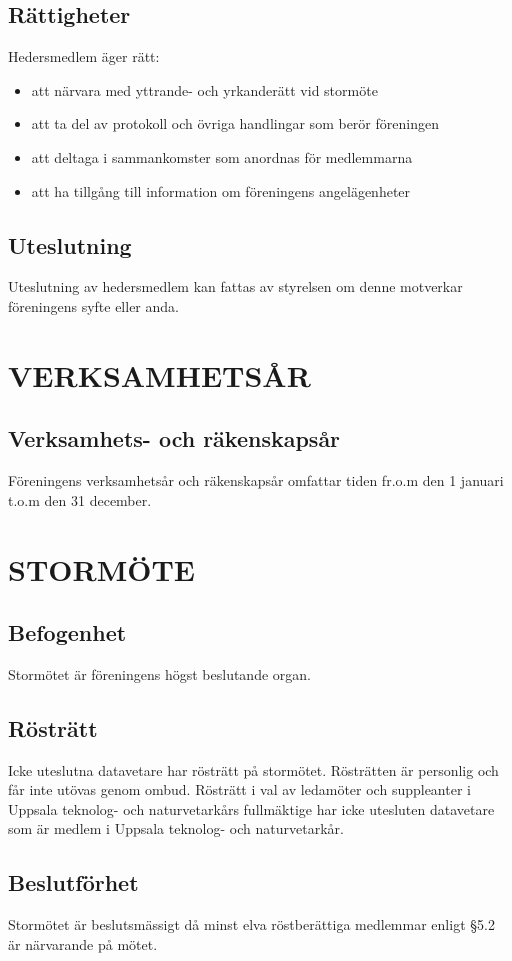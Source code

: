 \documentclass[a4paper]{article}
\begin{document}
{{    \subsection{Rättigheter}
    Hedersmedlem äger rätt:
    \begin{itemize}
    \item att närvara med yttrande- och yrkanderätt vid stormöte
    \item att ta del av protokoll och övriga handlingar som berör föreningen
    \item att deltaga i sammankomster som anordnas för medlemmarna
    \item att ha tillgång till information om föreningens angelägenheter
    \end{itemize}
    \subsection{Uteslutning}
    Uteslutning av hedersmedlem kan fattas av styrelsen om denne motverkar föreningens syfte eller anda.}
  \section{VERKSAMHETSÅR}
  {\subsection{Verksamhets- och räkenskapsår}
    Föreningens verksamhetsår och räkenskapsår omfattar tiden fr.o.m den 1 januari t.o.m den 31 december.}
  \section{STORMÖTE}
  {\subsection{Befogenhet}
  Stormötet är föreningens högst beslutande organ.
  \subsection{Rösträtt}
  Icke uteslutna datavetare har rösträtt på stormötet. Rösträtten är personlig och får inte utövas genom ombud. Rösträtt i val av ledamöter och suppleanter i Uppsala teknolog- och naturvetarkårs fullmäktige har icke utesluten datavetare som är
  medlem i Uppsala teknolog- och naturvetarkår.
  \subsection{Beslutförhet}
  Stormötet är beslutsmässigt då minst elva röstberättiga medlemmar enligt §5.2 är närvarande på mötet.  
}}
\end{document}
